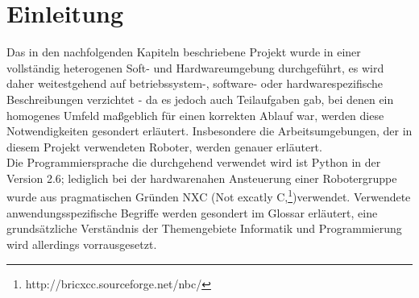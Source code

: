 \chapter{Einleitung}

Das in den nachfolgenden Kapiteln beschriebene Projekt wurde in einer vollständig heterogenen Soft- und Hardwareumgebung durchgeführt, es wird daher weitestgehend auf betriebssystem-, software- oder hardwarespezifische Beschreibungen verzichtet - da es jedoch auch Teilaufgaben gab, bei denen ein homogenes Umfeld maßgeblich für einen korrekten Ablauf war, werden diese Notwendigkeiten gesondert erläutert. Insbesondere die Arbeitsumgebungen, der in diesem Projekt verwendeten Roboter, werden genauer erläutert.\\
Die Programmiersprache die durchgehend verwendet wird ist Python in der Version 2.6; lediglich bei der hardwarenahen Ansteuerung einer Robotergruppe wurde aus pragmatischen Gründen NXC (Not excatly C,\footnote{http://bricxcc.sourceforge.net/nbc/})verwendet.
Verwendete anwendungsspezifische Begriffe werden gesondert im Glossar erläutert, eine grundsätzliche Verständnis der Themengebiete Informatik und Programmierung wird allerdings vorrausgesetzt.
